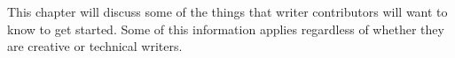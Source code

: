 
This chapter will discuss some of the things that writer contributors will want to know to get started. Some of this information applies regardless of whether they are creative or technical writers.



\StopChapter

